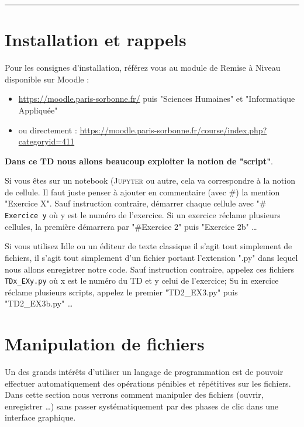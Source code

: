 
\newcommand{\numTD}{TD2}
\newcommand{\themeTD}{Lecture/écriture de fichiers}




\hrule

\section*{Installation et rappels}

 Pour les consignes d'installation, référez vous au module de Remise à Niveau disponible sur Moodle :
\begin{itemize}
\item \url{https://moodle.paris-sorbonne.fr/} puis "Sciences Humaines" et "Informatique Appliquée"
\item ou directement : \url{https://moodle.paris-sorbonne.fr/course/index.php?categoryid=411}
\end{itemize}

 \textbf{Dans ce TD nous allons beaucoup exploiter la notion de "script"}.

 Si vous êtes sur un notebook (\textsc{Jupyter} ou autre, cela va correspondre à la notion de cellule. Il faut juste penser à ajouter en commentaire (avec \#) la mention "Exercice X". Sauf instruction contraire, démarrer chaque cellule avec "\# \texttt{Exercice y} où y est le numéro de l'exercice. Si un exercice réclame plusieurs cellules, la première démarrera par "\#Exercice 2" puis "Exercice 2b" \dots

Si vous utilisez Idle ou un éditeur de texte classique il s'agit tout simplement de fichiers, il s'agit tout simplement d'un fichier portant l'extension ".py" dans lequel nous allons enregistrer notre code. 
Sauf instruction contraire, appelez ces fichiers \texttt{TDx\_EXy.py} où x est le numéro du TD et y celui de l'exercice; Su in exercice réclame plusieurs scripts, appelez le premier "TD2\_EX3.py" puis "TD2\_EX3b.py" \dots

\newpage
\section{Manipulation de fichiers}
 Un des grands intérêts d'utiliser un langage de programmation est de pouvoir effectuer automatiquement des opérations pénibles et répétitives sur les fichiers. Dans cette section nous verrons comment manipuler des fichiers (ouvrir, enregistrer \dots) sans passer systématiquement par des phases de clic dans une interface graphique.

